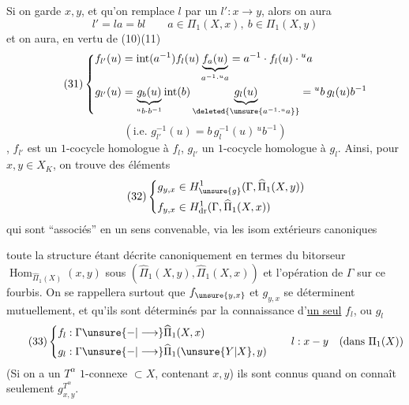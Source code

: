 Si on garde $x,y$, et qu'on remplace $l$ par un $l':x\longrightarrow y$, alors  on aura
\[
l'=la=bl\qquad a\in\Pi_1(X,x),\ b\in\Pi_1(X,y)
\]
et on aura, en vertu de (10)(11)
\[
\tag{31}\left\{\begin{aligned}
f_{l'}(u)&=\operatorname{int}(a^{-1})f_l(u)\underbrace{f_a(u)}_{a^{-1}\cdot{}^ua}=a^{-1}\cdot f_l(u)\cdot{}^ua\\
g_{l'}(u)&=\underbrace{g_b(u)}_{{}^ub\cdot b^{-1}}\operatorname{int}(b)\underbrace{g_l(u)}_{\deleted{\unsure{a^{-1}\cdot{}^ua}}}={}^ub\,g_l(u)b^{-1}
\end{aligned}\right.
\]
\[
(\text{i.e. }g_{l'}^{-1}(u)=b\,g_l^{-1}(u)\,{}^ub^{-1})
\]
, $f_{l'}$ est un $1$-cocycle  homologue à $f_l$, $g_{l'}$ un $1$-cocycle  homologue à $g_l$. Ainsi, pour $x,y\in X_K$, on trouve des éléments
\[
\tag{32}\left\{\begin{aligned}
g_{y,x}&\in H^1_{\unsure{g}}(\Gamma,\widehat\Pi_1(X,y))\\
f_{y,x}&\in H^1_{\mathrm{dr}}(\Gamma,\widehat\Pi_1(X,x))
\end{aligned}\right.
\]
 qui sont ``associés'' en un sens convenable, via les isom extérieurs canoniques


toute la structure étant décrite canoniquement en termes du bitorseur $\operatorname{Hom}_{\widehat\Pi_1(X)}(x,y)$ sous $(\widehat\Pi_1(X,y),\widehat\Pi_1(X,x))$ et l'opération de $\Gamma$ sur  ce fourbis. On se rappellera surtout que $f_{\unsure{y,x}}$ et $g_{y,x}$ se déterminent mutuellement, et qu'ils sont déterminés par la connaissance d'\uline{un seul}   $f_l$, ou $g_l$
\[
\tag{33}\left\{\begin{aligned}
f_l&:\Gamma\unsure{\mathbin{-}|\longrightarrow}\widehat\Pi_1(X,x)\\
g_l&:\Gamma\unsure{\mathbin{-}|\longrightarrow}\widehat\Pi_1(\unsure{Y|X},y)
\end{aligned}\right.
\qquad l:x\mathbin{-}y\quad(\text{dans }\Pi_1(X))
\]
(Si on a  un $T^\alpha$ $1$-connexe $\subset X$, contenant $x,y$) ils sont connus quand on connaît seulement $g^{T^\alpha}_{x,y}$.

